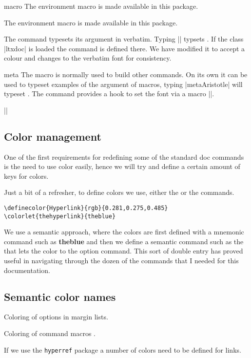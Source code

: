 \begin{environment}{macro} The environment macro is made available in this
package. 
\end{environment}

 The environment macro is made available in this package. 

\begin{macro}{\cmd} The command \cmd{\cmd} typesets its argument in
  verbatim. Typing |\cmd{\cmd}| typsets \cmd{\cmd}. If the class
  |ltxdoc| is loaded the command is defined there. We have modified
  it to accept a colour and changes to the verbatim font 
  for consistency.
\end{macro}

\begin{macro}{meta}
The macro  is normally used to build other commands. On its own it can be used to typeset
examples of the argument of macros, typing |meta{Aristotle}| will typeset . The command provides a hook to set the font via a macro |\meta@font@select|. 
\end{macro}


|\def\meta@font@select{\upshape\color{black}}|


\subsection{Color management}
One of the first requirements for redefining some of the standard doc commands is the need to use color easily, hence we will try and define a certain amount of keys for colors.

Just a bit of a refresher, to define colors we use, either the  or the  commands.


\begin{verbatim}
\definecolor{Hyperlink}{rgb}{0.281,0.275,0.485}
\colorlet{thehyperlink}{theblue}
\end{verbatim}


We use a semantic approach, where the colors are first defined with a mnemonic command such as {\bfseries\textcolor{theblue}{theblue}} and then we define a semantic command such as the that lets the color to the option command. This sort of double entry has proved useful in navigating through the dozen of the commands that I needed for this documentation.


\subsection{Semantic color names}
\begin{marglist}
\item [\option{theoption}] Coloring of options in margin lists.
\item [\option{themacro}] Coloring of command macros .
\item [\option{hyperlink}] If we use the \texttt{hyperref} package a number of colors need to be defined for links.
\end{marglist}

